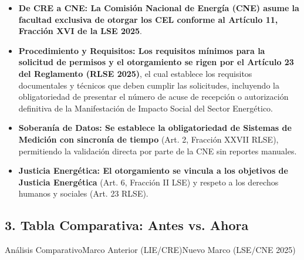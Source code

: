 \documentclass{cel}
\begin{document}
\begin{itemize}
\item \textbf{De CRE a CNE: \textbf{ La }Comisión Nacional de Energía (CNE) \textbf{ asume la facultad exclusiva de otorgar los CEL conforme al }Artículo 11, Fracción XVI de la LSE 2025}.
\item \textbf{Procedimiento y Requisitos: \textbf{ Los requisitos mínimos para la solicitud de permisos y el otorgamiento se rigen por el }Artículo 23 del Reglamento (RLSE 2025)}, el cual establece los requisitos documentales y técnicos que deben cumplir las solicitudes, incluyendo la obligatoriedad de presentar el número de acuse de recepción o autorización definitiva de la Manifestación de Impacto Social del Sector Energético.
\item \textbf{Soberanía de Datos: \textbf{ Se establece la obligatoriedad de }Sistemas de Medición con sincronía de tiempo} (Art. 2, Fracción XXVII RLSE), permitiendo la validación directa por parte de la CNE sin reportes manuales.
\item \textbf{Justicia Energética: \textbf{ El otorgamiento se vincula a los objetivos de }Justicia Energética} (Art. 6, Fracción II LSE) y respeto a los derechos humanos y sociales (Art. 23 RLSE).


\end{itemize}
\vspace{0.4cm}
\subsection{3. Tabla Comparativa: Antes vs. Ahora}
\nopagebreak

\vspace{0.3cm}
\begin{tablaParadigmaV2}{Análisis Comparativo}{Marco Anterior (LIE/CRE)}{Nuevo Marco (LSE/CNE 2025)}
\end{tablaParadigmaV2}
\end{document}

